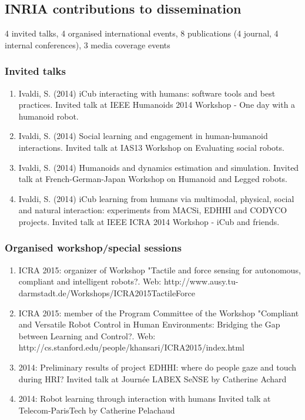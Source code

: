 \subsection{INRIA contributions to dissemination}

4 invited talks, 4 organised international events, 8 publications (4 journal, 4 internal conferences), 3 media coverage events

\subsubsection{Invited talks}
\begin{enumerate}
\item Ivaldi, S. (2014) iCub interacting with humans: software tools and best practices. Invited talk at IEEE Humanoids 2014 Workshop - One day with a humanoid robot.
\item Ivaldi, S. (2014) Social learning and engagement in human-humanoid interactions. Invited talk at IAS13 Workshop on Evaluating social robots.
\item  Ivaldi, S. (2014) Humanoids and dynamics estimation and simulation. Invited talk at French-German-Japan Workshop on Humanoid and Legged robots.
\item Ivaldi, S. (2014) iCub learning from humans via multimodal, physical, social and natural interaction: experiments from MACSi, EDHHI and CODYCO projects. Invited talk at IEEE ICRA 2014 Workshop - iCub and friends.
\end{enumerate}


\subsubsection{Organised workshop/special sessions}
\begin{enumerate}
\item  ICRA 2015: organizer of Workshop "Tactile and force sensing for autonomous, compliant and intelligent robots?. Web: http://www.ausy.tu-darmstadt.de/Workshops/ICRA2015TactileForce 
\item  ICRA 2015: member of the Program Committee of the Workshop "Compliant and Versatile Robot Control in Human Environments: Bridging the Gap between Learning and Control?. Web: http://cs.stanford.edu/people/khansari/ICRA2015/index.html 
\item  2014: Preliminary results of project EDHHI: where do people gaze and touch during HRI?
Invited talk at Journée LABEX SeNSE by Catherine Achard
\item  2014: Robot learning through interaction with humans
Invited talk at Telecom-ParisTech by Catherine Pelachaud
\end{enumerate}


